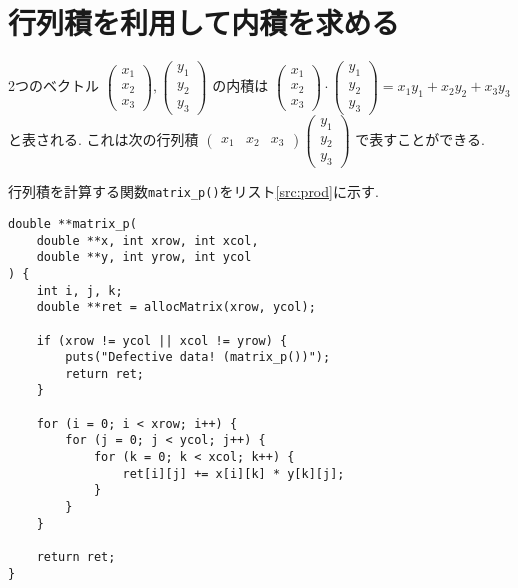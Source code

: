 \documentclass{jsarticle}
\begin{document}
    \section{行列積を利用して内積を求める}
        2つのベクトル
        $
            \left(
                \begin{array}{c}
                x_1 \\
                x_2 \\
                x_3
                \end{array}
            \right),
            \left(
                \begin{array}{c}
                y_1 \\
                y_2 \\
                y_3
                \end{array}
            \right)
        $
        の内積は
        $
            \left(
                \begin{array}{c}
                    x_1 \\
                    x_2 \\
                    x_3
                \end{array}
            \right) \cdot
            \left(
                \begin{array}{c}
                    y_1 \\
                    y_2 \\
                    y_3
                \end{array}
            \right) =
            x_1y_1+x_2y_2+x_3y_3
        $と表される.
        これは次の行列積
        $
            \left(
                \begin{array}{ccc}
                    x_1 & x_2 & x_3
                \end{array}
            \right)
            \left(
                \begin{array}{c}
                    y_1 \\
                    y_2 \\
                    y_3
                \end{array}
            \right)
        $
        で表すことができる.

        行列積を計算する関数\verb|matrix_p()|をリスト\ref{src:prod}に示す.

        \begin{lstlisting}[caption=prod.c, label=src:prod]
double **matrix_p(
    double **x, int xrow, int xcol,
    double **y, int yrow, int ycol
) {
    int i, j, k;
    double **ret = allocMatrix(xrow, ycol);

    if (xrow != ycol || xcol != yrow) {
        puts("Defective data! (matrix_p())");
        return ret;
    }

    for (i = 0; i < xrow; i++) {
        for (j = 0; j < ycol; j++) {
            for (k = 0; k < xcol; k++) {
                ret[i][j] += x[i][k] * y[k][j];
            }
        }
    }

    return ret;
}\end{lstlisting}
        
\end{document}
